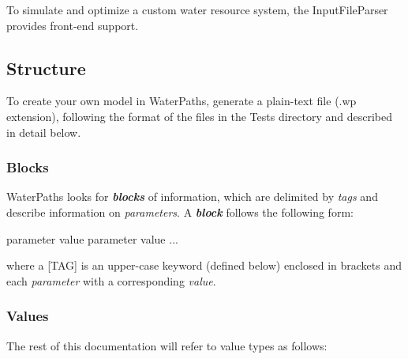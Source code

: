 To simulate and optimize a custom water resource system, the Input\+File\+Parser provides front-\/end support.

\subsection*{Structure}

To create your own model in Water\+Paths, generate a plain-\/text file (.wp extension), following the format of the files in the {\ttfamily Tests} directory and described in detail below.

\subsubsection*{Blocks}

Water\+Paths looks for {\itshape {\bfseries blocks}} of information, which are delimited by {\itshape tags} and describe information on {\itshape parameters}. A {\itshape {\bfseries block}} follows the following form\+:


\begin{DoxyCode}
[TAG]
parameter value
parameter value
...
\end{DoxyCode}


where a \mbox{[}T\+AG\mbox{]} is an upper-\/case keyword (defined below) enclosed in brackets and each {\itshape parameter} with a corresponding {\itshape value}.

\subsubsection*{Values}

The rest of this documentation will refer to value types as follows\+:

